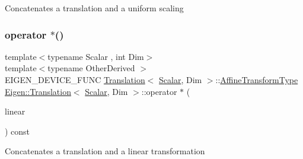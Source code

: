 Concatenates a translation and a uniform scaling \mbox{\label{class_eigen_1_1_translation_a4733741b04281588c204d8f183748f2c}} 
\subsubsection{\texorpdfstring{operator $\ast$()}{operator *()}\hspace{0.1cm}{\footnotesize\ttfamily [3/6]}}
{\footnotesize\ttfamily template$<$typename Scalar , int Dim$>$ \\
template$<$typename Other\+Derived $>$ \\
E\+I\+G\+E\+N\+\_\+\+D\+E\+V\+I\+C\+E\+\_\+\+F\+U\+NC \mbox{\hyperlink{class_eigen_1_1_translation}{Translation}}$<$ \mbox{\hyperlink{class_eigen_1_1_translation_ad596bf21ced4b902cc242205df486e21}{Scalar}}, Dim $>$\+::\mbox{\hyperlink{class_eigen_1_1_translation_a25c762409320ba9490a0d12c6652bbad}{Affine\+Transform\+Type}} \mbox{\hyperlink{class_eigen_1_1_translation}{Eigen\+::\+Translation}}$<$ \mbox{\hyperlink{class_eigen_1_1_translation_ad596bf21ced4b902cc242205df486e21}{Scalar}}, Dim $>$\+::operator $\ast$ (\begin{DoxyParamCaption}\item[{const \mbox{\hyperlink{struct_eigen_1_1_eigen_base}{Eigen\+Base}}$<$ Other\+Derived $>$ \&}]{linear }\end{DoxyParamCaption}) const\hspace{0.3cm}{\ttfamily [inline]}}

Concatenates a translation and a linear transformation \mbox{\label{class_eigen_1_1_translation_a5d5f4e7c7b6219b79760e387b17e099d}} 
